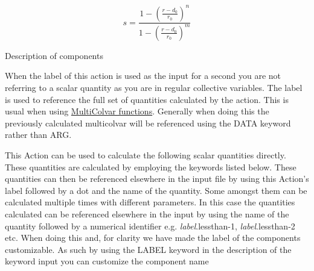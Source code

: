 \[ s = \frac{ 1 - \left(\frac{r-d_0}{r_0}\right)^n } { 1 - \left(\frac{r-d_0}{r_0}\right)^m } \]

\begin{DoxyParagraph}{Description of components}

\end{DoxyParagraph}
When the label of this action is used as the input for a second you are not referring to a scalar quantity as you are in regular collective variables. The label is used to reference the full set of quantities calculated by the action. This is usual when using \hyperlink{mcolv_multicolvarfunction}{Multi\+Colvar functions}. Generally when doing this the previously calculated multicolvar will be referenced using the D\+A\+T\+A keyword rather than A\+R\+G.

This Action can be used to calculate the following scalar quantities directly. These quantities are calculated by employing the keywords listed below. These quantities can then be referenced elsewhere in the input file by using this Action's label followed by a dot and the name of the quantity. Some amongst them can be calculated multiple times with different parameters. In this case the quantities calculated can be referenced elsewhere in the input by using the name of the quantity followed by a numerical identifier e.\+g. {\itshape label}.lessthan-\/1, {\itshape label}.lessthan-\/2 etc. When doing this and, for clarity we have made the label of the components customizable. As such by using the L\+A\+B\+E\+L keyword in the description of the keyword input you can customize the component name

